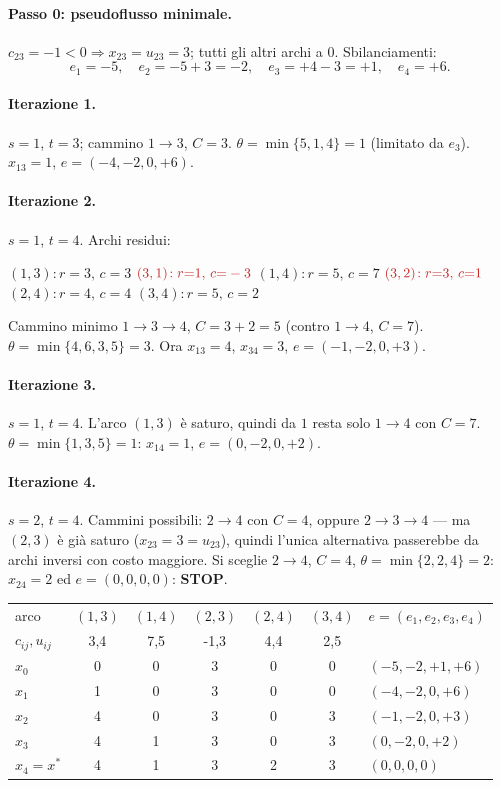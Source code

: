 \documentclass[11pt,a4paper]{article}
\newcommand{\rd}[4]{\mbox{$(#1,#2)\!:r{=}#3,\,c{=}#4$}\hspace{1.1em}}
\newcommand{\ri}[4]{\mbox{$\textcolor{neg}{(#1,#2)\!:r{=}#3,\,c{=}#4}$}\hspace{1.1em}}
\newenvironment{resid}{\par\smallskip\noindent\small\raggedright\ignorespaces}{\par\smallskip\noindent}
\begin{document}
\begin{sol}
\paragraph{Passo 0: pseudoflusso minimale.} $c_{23}=-1<0\Rightarrow x_{23}=u_{23}=3$;
tutti gli altri archi a $0$. Sbilanciamenti:
\[
 e_1=-5,\quad e_2=-5+3=-2,\quad e_3=+4-3=+1,\quad e_4=+6 .
\]

\paragraph{Iterazione 1.} $s=1$, $t=3$; cammino $1\to3$, $C=3$.
$\theta=\min\{5,1,4\}=1$ (limitato da $e_3$). $x_{13}=1$, $e=(-4,-2,0,+6)$.

\paragraph{Iterazione 2.} $s=1$, $t=4$. Archi residui:
\begin{resid}
\rd{1}{3}{3}{3} \ri{3}{1}{1}{-3} \rd{1}{4}{5}{7} \ri{3}{2}{3}{1}
\rd{2}{4}{4}{4} \rd{3}{4}{5}{2}
\end{resid}
Cammino minimo $1\to3\to4$, $C=3+2=5$ (contro $1\to4$, $C=7$).
$\theta=\min\{4,6,3,5\}=3$. Ora $x_{13}=4$, $x_{34}=3$, $e=(-1,-2,0,+3)$.

\paragraph{Iterazione 3.} $s=1$, $t=4$. L'arco $(1,3)$ è saturo, quindi da $1$ resta solo
$1\to4$ con $C=7$. $\theta=\min\{1,3,5\}=1$: $x_{14}=1$, $e=(0,-2,0,+2)$.

\paragraph{Iterazione 4.} $s=2$, $t=4$. Cammini possibili: $2\to4$ con $C=4$, oppure
$2\to3\to4$ — ma $(2,3)$ è già saturo ($x_{23}=3=u_{23}$), quindi l'unica alternativa
passerebbe da archi inversi con costo maggiore. Si sceglie $2\to4$, $C=4$,
$\theta=\min\{2,2,4\}=2$: $x_{24}=2$ ed $e=(0,0,0,0)$: \textbf{STOP}.

\begin{center}\small
\begin{tabular}{@{}lccccc|l@{}}
\toprule
arco & $(1,3)$ & $(1,4)$ & $(2,3)$ & $(2,4)$ & $(3,4)$ & $e=(e_1,e_2,e_3,e_4)$\\
$c_{ij},u_{ij}$ & 3,4 & 7,5 & -1,3 & 4,4 & 2,5 & \\
\midrule
$x_0$ & 0 & 0 & 3 & 0 & 0 & $(-5,-2,+1,+6)$\\
$x_1$ & 1 & 0 & 3 & 0 & 0 & $(-4,-2,0,+6)$\\
$x_2$ & 4 & 0 & 3 & 0 & 3 & $(-1,-2,0,+3)$\\
$x_3$ & 4 & 1 & 3 & 0 & 3 & $(0,-2,0,+2)$\\
$x_4=x^\ast$ & 4 & 1 & 3 & 2 & 3 & $(0,0,0,0)$\\
\bottomrule
\end{tabular}
\end{center}


\end{sol}
\end{document}
